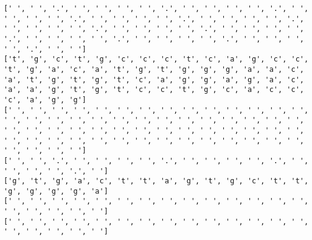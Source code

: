 \documentclass{article}
\begin{document}
\begin{Verbatim}
[' ', ' ', '.', ' ', ' ', ' ', ' ', '.', ' ', ' ', ' ', ' ', '.', ' ', ' ', ' ', ' ', '.', ' ', ' ', ' ', ' ', '.', ' ', ' ', ' ', ' ', '.', ' ', ' ', ' ', ' ', '.', ' ', ' ', ' ', ' ', '.', ' ', ' ', ' ', ' ', '.', ' ', ' ', ' ', ' ', '.', ' ', ' ', ' ', ' ', '.', ' ', ' ', ' ', ' ', '.', ' ', ' ']
['t', 'g', 'c', 't', 'g', 'c', 'c', 'c', 't', 'c', 'a', 'g', 'c', 'c', 't', 'g', 'a', 'c', 'a', 't', 'g', 't', 'g', 'g', 'g', 'a', 'a', 'c', 'a', 't', 'g', 't', 'g', 't', 'c', 'a', 'g', 'g', 'a', 'g', 'a', 'c', 'a', 'a', 'g', 't', 'g', 't', 'c', 'c', 't', 'g', 'c', 'a', 'c', 'c', 'c', 'a', 'g', 'g']
[' ', ' ', ' ', ' ', ' ', ' ', ' ', ' ', ' ', ' ', ' ', ' ', ' ', ' ', ' ', ' ', ' ', ' ', ' ', ' ', ' ', ' ', ' ', ' ', ' ', ' ', ' ', ' ', ' ', ' ', ' ', ' ', ' ', ' ', ' ', ' ', ' ', ' ', ' ', ' ', ' ', ' ', ' ', ' ', ' ', ' ', ' ', ' ', ' ', ' ', ' ', ' ', ' ', ' ', ' ', ' ', ' ', ' ', ' ', ' ']
[' ', ' ', '.', ' ', ' ', ' ', ' ', '.', ' ', ' ', ' ', ' ', '.', ' ', ' ', ' ', ' ', '.', ' ']
['g', 't', 'g', 'a', 'c', 't', 't', 'a', 'g', 't', 'g', 'c', 't', 't', 'g', 'g', 'g', 'g', 'a']
[' ', ' ', ' ', ' ', ' ', ' ', ' ', ' ', ' ', ' ', ' ', ' ', ' ', ' ', ' ', ' ', ' ', ' ', ' ']
[' ', ' ', ' ', ' ', ' ', ' ', ' ', ' ', ' ', ' ', ' ', ' ', ' ', ' ', ' ', ' ', ' ', ' ', ' ']
 

\end{Verbatim}
\end{document}
